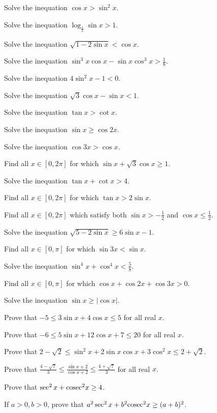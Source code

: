 \item Solve the inequation $\cos x > \sin^2x$.
\item Solve the inequation $\log_{\frac{1}{2}}\sin x > 1$.
\item Solve the inequation $\sqrt{1 - 2\sin x} < \cos x$.
\item Solve the inequation $\sin^3x\cos x - \sin x\cos^3x > \frac{1}{8}$.
\item Solve the inequation $4\sin^2x - 1 < 0$.
\item Solve the inequation $\sqrt{3}\cos x - \sin x < 1$.
\item Solve the inequation $\tan x > \cot x$.
\item Solve the inequation $\sin x\geq \cos2x$.
\item Solve the inequation $\cos3x > \cos x$.
\item Find all $x\in[0, 2\pi]$ for which $\sin x + \sqrt{3}\cos x\geq 1$.
\item Solve the inequation $\tan x + \cot x > 4$.
\item Find all $x\in[0, 2\pi]$ for which $\tan x > 2\sin x$.
\item Find all $x\in[0, 2\pi]$ which satisfy both $\sin x > -\frac{1}{2}$ and $\cos x\leq \frac{1}{2}$.
\item Solve the inequation $\sqrt{5 - 2\sin x}\geq 6\sin x - 1$.
\item Find all $x\in[0, \pi]$ for which $\sin3x < \sin x$.
\item Solve the inequation $\sin^4x + \cos^4x < \frac{5}{8}$.
\item Find all $x\in[0, \pi]$ for which $\cos x + \cos2x + \cos3x > 0$.
\item Solve the inequation $\sin x\geq |\cos x|$.
\item Prove that $-5\leq 3\sin x + 4\cos x\leq 5$ for all real $x$.
\item Prove that $-6\leq 5\sin x + 12\cos x + 7\leq 20$ for all real $x$.
\item Prove that $2 - \sqrt{2}\leq \sin^2x + 2\sin x\cos x + 3\cos^2x\leq 2 + \sqrt{2}$.
\item Prove that $\frac{4 - \sqrt{7}}{3}\leq \frac{\sin x + 2}{\cos x + 2}\leq \frac{4 + \sqrt{7}}{3}$ for all
  real $x$.
\item Prove that $\sec^2x + {\rm cosec}^2x\geq 4$.
\item If $a > 0, b > 0$, prove that $a^2\sec^2x + b^2{\rm cosec}^2x\geq (a + b)^2$.
